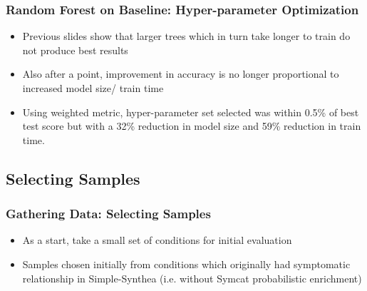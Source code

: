 \documentclass{beamer}
\begin{document}
\begin{frame}
\frametitle{Random Forest on Baseline: Hyper-parameter Optimization}
\begin{itemize}
	\item Previous slides show that larger trees which in turn take longer to train do not produce best results
	\item Also after a point, improvement in accuracy is no longer proportional to increased model size/ train time
	\item Using weighted metric, hyper-parameter set selected was within 0.5\% of best test score but with a 32\% reduction in model size and 59\% reduction in train time.
\end{itemize}
\end{frame}


\subsection{Selecting  Samples}
	\begin{frame}
	\frametitle{Gathering Data: Selecting  Samples}
	\begin{itemize}
		\item As a start, take a small set of conditions for initial evaluation
		\item Samples chosen initially from conditions which originally had symptomatic relationship in Simple-Synthea (i.e. without Symcat probabilistic enrichment) 
	\end{itemize}
	\end{frame}
\end{document}

